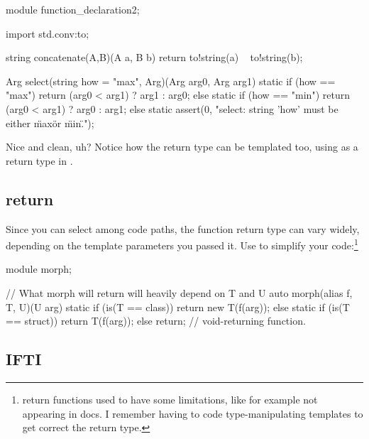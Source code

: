 \begin{dcode}
module function_declaration2;

import std.conv:to;

string concatenate(A,B)(A a, B b)
{
    return to!string(a) ~ to!string(b);
}

Arg select(string how = "max", Arg)(Arg arg0, Arg arg1)
{
    static if (how == "max")
        return (arg0 < arg1) ? arg1 : arg0;
    else static if (how == "min")
        return (arg0 < arg1) ? arg0 : arg1;
    else
        static assert(0, 
        "select: string 'how' must be either \"max\" or \"min\".");
}      
\end{dcode}

Nice and clean, uh? Notice how the return type can be templated too, using  as a return type in . 

\subsection{\texorpdfstring{ return}
                           {auto return}}
\label{autoreturn}

Since you can select among code paths, the function return type can vary widely, depending on the template parameters you passed it. Use  to simplify your code:\footnote{  return functions used to have some limitations, like for example not appearing in docs. I remember having to code type-manipulating templates to get correct the return type.}

\begin{dcode}
module morph;

// What morph will return will heavily depend on T and U
auto morph(alias f, T, U)(U arg)
{
    static if (is(T == class))
        return new T(f(arg));
    else static if (is(T == struct))
        return T(f(arg));
    else
        return; // void-returning function.    
}
\end{dcode}


\subsection{IFTI}\label{ifti}

